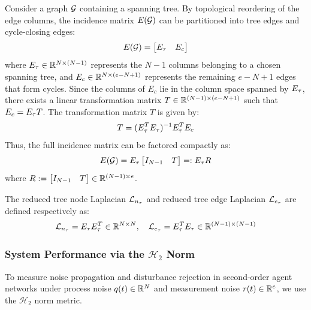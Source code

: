 \begin{definition} \label{def:spanning_tree_factorization}
\leavevmode\par\noindent
Consider a graph $\mathcal{G}$ containing a spanning tree. By topological reordering of the edge columns, the incidence matrix $E(\mathcal{G})$ can be partitioned into tree edges and cycle-closing edges:
\begin{equation}
    E(\mathcal{G}) = \begin{bmatrix} E_{\tau} & E_c \end{bmatrix}
\end{equation}
where $E_{\tau} \in \mathbb{R}^{N \times (N-1)}$ represents the $N-1$ columns belonging to a chosen spanning tree, and $E_c \in \mathbb{R}^{N \times (e - N + 1)}$ represents the remaining $e - N + 1$ edges that form cycles.
Since the columns of $E_c$ lie in the column space spanned by $E_{\tau}$, there exists a linear transformation matrix $T \in \mathbb{R}^{(N-1) \times (e - N + 1)}$ such that $E_c = E_{\tau} T$. The transformation matrix $T$ is given by:
\begin{equation}
    T = (E_{\tau}^T E_{\tau})^{-1} E_{\tau}^T E_c
\end{equation}
Thus, the full incidence matrix can be factored compactly as:
\begin{equation}\label{eq:incidence_factored}
    E(\mathcal{G}) = E_{\tau} \begin{bmatrix} I_{N-1} & T \end{bmatrix} =: E_{\tau} R
\end{equation}
where $R := \begin{bmatrix} I_{N-1} & T \end{bmatrix} \in \mathbb{R}^{(N-1) \times e}$.

The reduced tree node Laplacian $\mathcal{L}_{n_{\tau}}$ and reduced tree edge Laplacian $\mathcal{L}_{e_{\tau}}$ are defined respectively as:
\begin{equation}
    \mathcal{L}_{n_{\tau}} = E_{\tau} E_{\tau}^T \in \mathbb{R}^{N \times N}, \quad \mathcal{L}_{e_{\tau}} = E_{\tau}^T E_{\tau} \in \mathbb{R}^{(N-1) \times (N-1)}
\end{equation}
\end{definition}

\subsubsection{System Performance via the $\mathcal{H}_2$ Norm}
To measure noise propagation and disturbance rejection in second-order agent networks under process noise $q(t) \in \mathbb{R}^N$ and measurement noise $r(t) \in \mathbb{R}^e$, we use the $\mathcal{H}_2$ norm metric.

